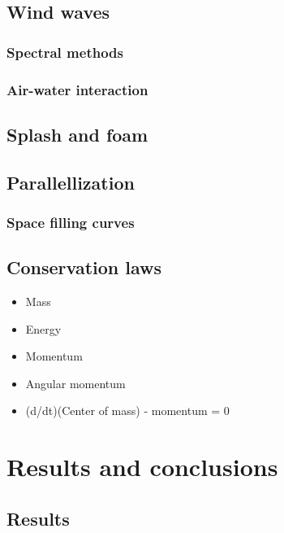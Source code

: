 \documentclass[]{report}
\begin{document}
\chapter{Wind waves}

\section{Spectral methods}

\section{Air-water interaction}

\chapter{Splash and foam}

\chapter{Parallellization}

\section{Space filling curves}

\chapter{Conservation laws}

\begin{itemize}
    \item Mass
    \item Energy
    \item Momentum
    \item Angular momentum
    \item (d/dt)(Center of mass) - momentum = 0
\end{itemize}


\part{Results and conclusions}

\chapter{Results}
\end{document}
